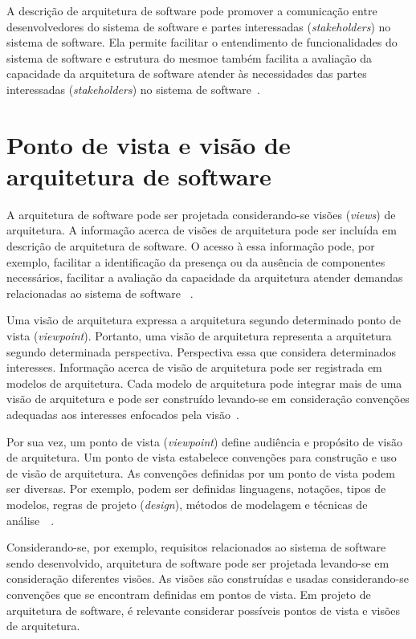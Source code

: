 A descrição de arquitetura de software pode promover a comunicação entre desenvolvedores do sistema de software e partes interessadas (\emph{stakeholders}) no sistema de software. Ela permite  facilitar o entendimento de funcionalidades do sistema de software e estrutura do mesmoe também facilita a avaliação da capacidade da arquitetura de software atender às necessidades das partes interessadas (\emph{stakeholders}) no sistema de software~\cite{ISO_42010}. 

\section{Ponto de vista e visão de arquitetura de software}

A arquitetura de software pode ser projetada considerando-se visões (\emph{views}) de arquitetura. A informação acerca de visões de arquitetura pode ser incluída em descrição de arquitetura de software. O acesso à essa informação pode, por exemplo, facilitar a identificação da presença ou da ausência de componentes necessários, facilitar a avaliação da capacidade da arquitetura atender demandas relacionadas ao sistema de software ~\cite{ISO_42010}.

Uma visão de arquitetura expressa a arquitetura segundo determinado ponto de vista (\emph{viewpoint}). Portanto, uma visão de arquitetura representa a arquitetura segundo determinada perspectiva. Perspectiva essa que considera determinados interesses. Informação acerca de visão de arquitetura pode ser registrada em modelos de arquitetura. Cada modelo de arquitetura pode integrar mais de uma visão de arquitetura e pode ser construído levando-se em consideração convenções adequadas aos interesses enfocados pela visão~\cite{ISO_42010}. 

Por sua vez, um ponto de vista (\emph{viewpoint}) define audiência e propósito de visão de arquitetura. Um ponto de vista estabelece convenções para construção e uso de visão de arquitetura. As convenções definidas por um ponto de vista podem ser diversas. Por exemplo, podem ser definidas linguagens, notações, tipos de modelos, regras de projeto (\emph{design}), métodos de modelagem e técnicas de análise~\cite{ISO_1471}~\cite{ISO_42010}. 

Considerando-se, por exemplo, requisitos relacionados ao sistema de software sendo desenvolvido, arquitetura de software pode ser projetada levando-se em consideração diferentes visões. As visões são construídas e usadas considerando-se convenções que se encontram definidas em pontos de vista. Em projeto de arquitetura de software, é relevante considerar possíveis pontos de vista e visões de arquitetura.


